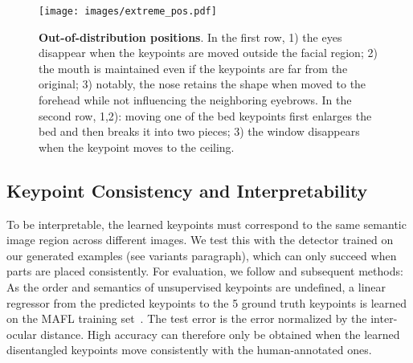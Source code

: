 \documentclass[10pt, conference, compsocconf]{IEEEtran}
\begin{document}
\begin{table}
 \vspace{-0pt}
 \begin{center}
\end{center}
\caption{\textbf{Quantitative ablation on keypoint localization} (
}
\label{tab:ablation_archi}\end{table}

\begin{figure}[t!]
\begin{center}
\texttt{[image: images/extreme\_pos.pdf]}
\end{center}
  \caption{\textbf{Out-of-distribution positions}. In the first row, 1) the eyes disappear when the keypoints are moved outside the facial region; 2) the mouth is maintained even if the keypoints are far from the original; 3) notably, the nose retains the shape when moved to the forehead while not influencing the neighboring eyebrows. In the second row, 1,2): moving one of the bed keypoints first enlarges the bed and then breaks it into two pieces; 3) the window disappears when the keypoint moves to the ceiling.}
\label{fig:extreme_pos}
\end{figure}

\subsection{Keypoint Consistency and Interpretability} \label{sec:unsupervised_keypoints_discovery}
To be interpretable, the learned keypoints must correspond to the same semantic image region across different images. We test this with the detector trained on our generated examples (see variants paragraph), which can only succeed when parts are placed consistently.
For evaluation, we follow \cite{thewlis2017unsupervised} and subsequent methods: As the order and semantics of unsupervised keypoints are undefined, a linear regressor from the predicted keypoints to the 5 ground truth keypoints is learned on the MAFL training set~\cite{zhang2014facial}.
The test error is the  error normalized by the inter-ocular distance.
High accuracy can therefore only be obtained when the learned disentangled keypoints move consistently with the human-annotated ones. 
\end{document}
